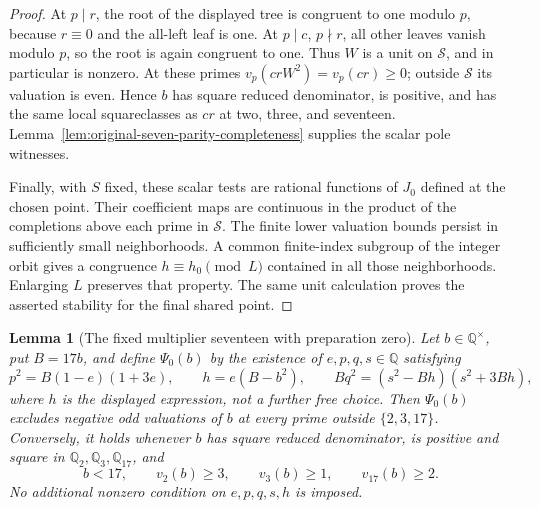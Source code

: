 \documentclass[11pt]{article}
\newtheorem{lemma}[theorem]{Lemma}
\theoremstyle{definition}
\theoremstyle{remark}
\newcommand{\Q}{\mathbb Q}
\begin{document}
\begin{proof}
At $p\mid r$, the root of the displayed tree is congruent to one
modulo $p$, because $r\equiv0$ and the all-left leaf is one.
At $p\mid c$, $p\nmid r$, all other leaves vanish modulo $p$,
so the root is again congruent to one. Thus $W$ is a unit on
$\mathcal S$, and in particular is nonzero. At these primes
$v_p(crW^2)=v_p(cr)\ge0$; outside $\mathcal S$ its valuation is
even. Hence $b$ has square reduced denominator, is positive, and
has the same local squareclasses as $cr$ at two, three, and
seventeen. Lemma~\ref{lem:original-seven-parity-completeness}
supplies the scalar pole witnesses.

Finally, with $S$ fixed, these scalar tests are rational functions
of $J_0$ defined at the chosen point. Their coefficient maps are
continuous in the product of the completions above each prime in
$\mathcal S$. The finite lower valuation bounds persist in
sufficiently small neighborhoods. A common finite-index subgroup
of the integer orbit gives a congruence $h\equiv h_0\pmod L$
contained in all those neighborhoods. Enlarging $L$ preserves
that property. The same unit calculation proves the asserted
stability for the final shared point.
\end{proof}

\begin{lemma}[The fixed multiplier seventeen with preparation zero]
\label{v5:preparation-zero-bridge}
Let $b\in\Q^\times$, put $B=17b$, and define $\Psi_0(b)$ by
the existence of $e,p,q,s\in\Q$ satisfying
\[
 p^2=B(1-e)(1+3e),\qquad h=e(B-b^2),\qquad
 Bq^2=(s^2-Bh)(s^2+3Bh),
\]
where $h$ is the displayed expression, not a further free choice.
Then $\Psi_0(b)$ excludes negative odd valuations of $b$ at every
prime outside $\{2,3,17\}$. Conversely, it holds whenever $b$ has
square reduced denominator, is positive and square in
$\Q_2,\Q_3,\Q_{17}$, and
\[
 b<17,\qquad v_2(b)\ge3,\qquad v_3(b)\ge1,
 \qquad v_{17}(b)\ge2.
\]
No additional nonzero condition on $e,p,q,s,h$ is imposed.
\end{lemma}
\end{document}
